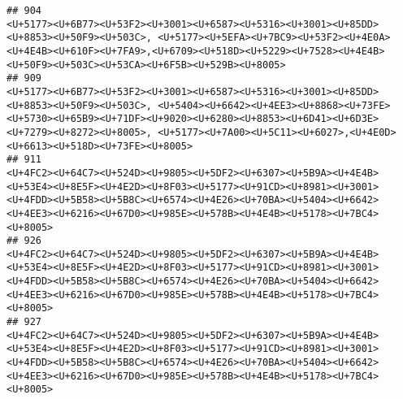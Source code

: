 \documentclass[
]{article}
\begin{document}
\begin{verbatim}
## 904                                                                                                                                                                                                                                                                                                                <U+5177><U+6B77><U+53F2><U+3001><U+6587><U+5316><U+3001><U+85DD><U+8853><U+50F9><U+503C>, <U+5177><U+5EFA><U+7BC9><U+53F2><U+4E0A><U+4E4B><U+610F><U+7FA9>,<U+6709><U+518D><U+5229><U+7528><U+4E4B><U+50F9><U+503C><U+53CA><U+6F5B><U+529B><U+8005>
## 909                                                                                                                                                                                                                                                              <U+5177><U+6B77><U+53F2><U+3001><U+6587><U+5316><U+3001><U+85DD><U+8853><U+50F9><U+503C>, <U+5404><U+6642><U+4EE3><U+8868><U+73FE><U+5730><U+65B9><U+71DF><U+9020><U+6280><U+8853><U+6D41><U+6D3E><U+7279><U+8272><U+8005>, <U+5177><U+7A00><U+5C11><U+6027>,<U+4E0D><U+6613><U+518D><U+73FE><U+8005>
## 911                                                                                                                                                                                                                                                                                           <U+4FC2><U+64C7><U+524D><U+9805><U+5DF2><U+6307><U+5B9A><U+4E4B><U+53E4><U+8E5F><U+4E2D><U+8F03><U+5177><U+91CD><U+8981><U+3001><U+4FDD><U+5B58><U+5B8C><U+6574><U+4E26><U+70BA><U+5404><U+6642><U+4EE3><U+6216><U+67D0><U+985E><U+578B><U+4E4B><U+5178><U+7BC4><U+8005>
## 926                                                                                                                                                                                                                                                                                           <U+4FC2><U+64C7><U+524D><U+9805><U+5DF2><U+6307><U+5B9A><U+4E4B><U+53E4><U+8E5F><U+4E2D><U+8F03><U+5177><U+91CD><U+8981><U+3001><U+4FDD><U+5B58><U+5B8C><U+6574><U+4E26><U+70BA><U+5404><U+6642><U+4EE3><U+6216><U+67D0><U+985E><U+578B><U+4E4B><U+5178><U+7BC4><U+8005>
## 927                                                                                                                                                                                                                                                                                           <U+4FC2><U+64C7><U+524D><U+9805><U+5DF2><U+6307><U+5B9A><U+4E4B><U+53E4><U+8E5F><U+4E2D><U+8F03><U+5177><U+91CD><U+8981><U+3001><U+4FDD><U+5B58><U+5B8C><U+6574><U+4E26><U+70BA><U+5404><U+6642><U+4EE3><U+6216><U+67D0><U+985E><U+578B><U+4E4B><U+5178><U+7BC4><U+8005>

\end{verbatim}
\end{document}
